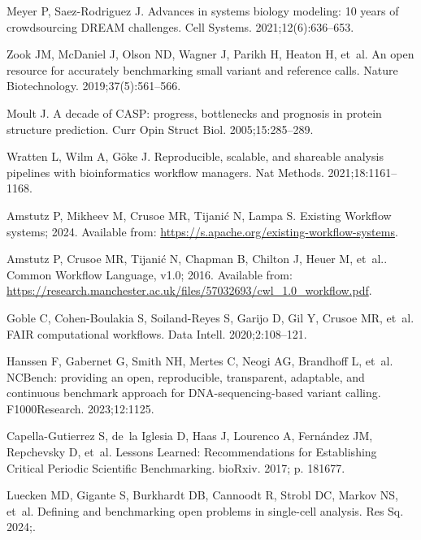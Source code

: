 \documentclass[11pt]{article}
\begin{document}
\begin{thebibliography}{10}
Meyer P, Saez-Rodriguez J.
\newblock Advances in systems biology modeling: 10 years of crowdsourcing DREAM
  challenges.
\newblock Cell Systems. 2021;12(6):636--653.

Zook JM, McDaniel J, Olson ND, Wagner J, Parikh H, Heaton H, et~al.
\newblock An open resource for accurately benchmarking small variant and
  reference calls.
\newblock Nature Biotechnology. 2019;37(5):561--566.

Moult J.
\newblock A decade of {CASP}: progress, bottlenecks and prognosis in protein
  structure prediction.
\newblock Curr Opin Struct Biol. 2005;15:285--289.

Wratten L, Wilm A, Göke J.
\newblock Reproducible, scalable, and shareable analysis pipelines with
  bioinformatics workflow managers.
\newblock Nat Methods. 2021;18:1161--1168.

Amstutz P, Mikheev M, Crusoe MR, Tijanić N, Lampa S. Existing Workflow
  systems; 2024.
\newblock Available from: \url{https://s.apache.org/existing-workflow-systems}.

Amstutz P, Crusoe MR, Tijanić N, Chapman B, Chilton J, Heuer M, et~al.. Common
  Workflow Language, {v1}.0; 2016.
\newblock Available from:
  \url{https://research.manchester.ac.uk/files/57032693/cwl_1.0_workflow.pdf}.

Goble C, Cohen-Boulakia S, Soiland-Reyes S, Garijo D, Gil Y, Crusoe MR, et~al.
\newblock FAIR computational workflows.
\newblock Data Intell. 2020;2:108--121.

Hanssen F, Gabernet G, Smith NH, Mertes C, Neogi AG, Brandhoff L, et~al.
\newblock NCBench: providing an open, reproducible, transparent, adaptable, and
  continuous benchmark approach for {DNA}-sequencing-based variant calling.
\newblock F1000Research. 2023;12:1125.

Capella-Gutierrez S, de~la Iglesia D, Haas J, Lourenco A, Fernández JM,
  Repchevsky D, et~al.
\newblock Lessons Learned: Recommendations for Establishing Critical Periodic
  Scientific Benchmarking.
\newblock bioRxiv. 2017; p. 181677.

Luecken MD, Gigante S, Burkhardt DB, Cannoodt R, Strobl DC, Markov NS, et~al.
\newblock Defining and benchmarking open problems in single-cell analysis.
\newblock Res Sq. 2024;.


\end{thebibliography}
\end{document}
